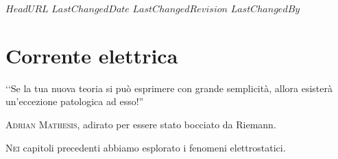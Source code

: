 \svnidlong
{$HeadURL$}
{$LastChangedDate$}
{$LastChangedRevision$}
{$LastChangedBy$}

\chapter{Corrente elettrica}

\begin{introduction}
	‘‘Se la tua nuova teoria si può esprimere con grande semplicità, allora esisterà un'eccezione patologica ad esso!'' %
\begin{flushright}
	\textsc{Adrian Mathesis,} adirato per essere stato bocciato da Riemann.
\end{flushright}
\end{introduction} %
\lettrine[findent=1pt, nindent=0pt]{N}{ei} capitoli precedenti abbiamo esplorato i fenomeni elettrostatici. 
